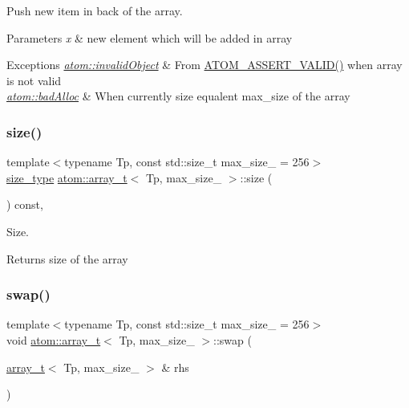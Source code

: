 Push new item in back of the array. 


\begin{DoxyParams}{Parameters}
{\em x} & new element which will be added in array \\
\hline
\end{DoxyParams}

\begin{DoxyExceptions}{Exceptions}
{\em \hyperlink{classatom_1_1invalid_object}{atom\+::invalid\+Object}} & From \hyperlink{debug__tools_8h_a273b49426c51bc6a7eb989ee0acbdc6b}{A\+T\+O\+M\+\_\+\+A\+S\+S\+E\+R\+T\+\_\+\+V\+A\+L\+I\+D()} when array is not valid \\
\hline
{\em \hyperlink{classatom_1_1bad_alloc}{atom\+::bad\+Alloc}} & When currently size equalent max\+\_\+size of the array \\
\hline
\end{DoxyExceptions}
\mbox{\label{classatom_1_1array__t_ab399c935e3103360bcd3aacd79d3bd06}} 
\subsubsection{\texorpdfstring{size()}{size()}}
{\footnotesize\ttfamily template$<$typename Tp, const std\+::size\+\_\+t max\+\_\+size\+\_\+ = 256$>$ \\
\hyperlink{classatom_1_1array__t_a8534f23c7f0082698cbd708e1f2e26ff}{size\+\_\+type} \hyperlink{classatom_1_1array__t}{atom\+::array\+\_\+t}$<$ Tp, max\+\_\+size\+\_\+ $>$\+::size (\begin{DoxyParamCaption}{ }\end{DoxyParamCaption}) const\hspace{0.3cm}{\ttfamily [inline]}, {\ttfamily [noexcept]}}



Size. 

\begin{DoxyReturn}{Returns}
size of the array 
\end{DoxyReturn}
\mbox{\label{classatom_1_1array__t_a139e38b7e830dc58885a768fe135dee5}} 
\subsubsection{\texorpdfstring{swap()}{swap()}}
{\footnotesize\ttfamily template$<$typename Tp, const std\+::size\+\_\+t max\+\_\+size\+\_\+ = 256$>$ \\
void \hyperlink{classatom_1_1array__t}{atom\+::array\+\_\+t}$<$ Tp, max\+\_\+size\+\_\+ $>$\+::swap (\begin{DoxyParamCaption}\item[{\hyperlink{classatom_1_1array__t}{array\+\_\+t}$<$ Tp, max\+\_\+size\+\_\+ $>$ \&}]{rhs }\end{DoxyParamCaption})\hspace{0.3cm}{\ttfamily [inline]}}



